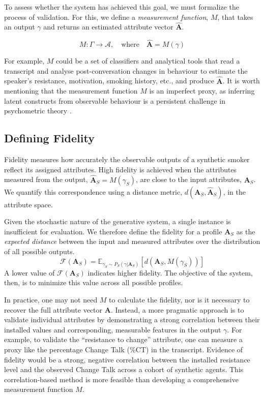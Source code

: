 To assess whether the system has achieved this goal, we must formalize the process of validation. For this, we define a \emph{measurement function}, $M$, that takes an output $\gamma$ and returns an estimated attribute vector $\hat{\textbf{A}}$.

$$M: \Gamma \rightarrow \mathcal{A}, \quad \text{where} \quad \hat{\textbf{A}} = M(\gamma)$$

For example, $M$ could be a set of classifiers and analytical tools that read a transcript and analyse post-conversation changes in behaviour to estimate the speaker's resistance, motivation, smoking history, etc., and produce $\hat{\textbf{A}}$. It is worth mentioning that the measurement function $M$ is an imperfect proxy, as inferring latent constructs from observable behaviour is a persistent challenge in psychometric theory \cite{loevinger1957objective, borsboom2004concept}.

\subsection{Defining Fidelity}

Fidelity measures how accurately the observable outputs of a synthetic smoker reflect its assigned attributes. High fidelity is achieved when the attributes measured from the output, $\hat{\textbf{A}}_S = M(\gamma_S)$, are close to the input attributes, $\textbf{A}_S$. We quantify this correspondence using a distance metric, $d(\textbf{A}_S, \hat{\textbf{A}}_S)$, in the attribute space.

Given the stochastic nature of the generative system, a single instance is insufficient for evaluation. We therefore define the fidelity for a profile $\textbf{A}_S$ as the \emph{expected distance} between the input and measured attributes over the distribution of all possible outputs.
$$\mathcal{F}(\textbf{A}_S) = \mathbb{E}_{\gamma_S \sim P_S(\gamma | \textbf{A}_S)}[d(\textbf{A}_S, M(\gamma_S))]$$
A lower value of $\mathcal{F}(\textbf{A}_S)$ indicates higher fidelity. The objective of the system, then, is to minimize this value across all possible profiles.

In practice, one may not need $M$ to calculate the fidelity, nor is it necessary to recover the full attribute vector $\textbf{A}$. Instead, a more pragmatic approach is to validate individual attributes by demonstrating a strong correlation between their installed values and corresponding, measurable features in the output $\gamma$. For example, to validate the ``resistance to change'' attribute, one can measure a proxy like the percentage Change Talk (\%CT) in the transcript. Evidence of fidelity would be a strong, negative correlation between the installed resistance level and the observed Change Talk across a cohort of synthetic agents. This correlation-based method is more feasible than developing a comprehensive measurement function $M$.

